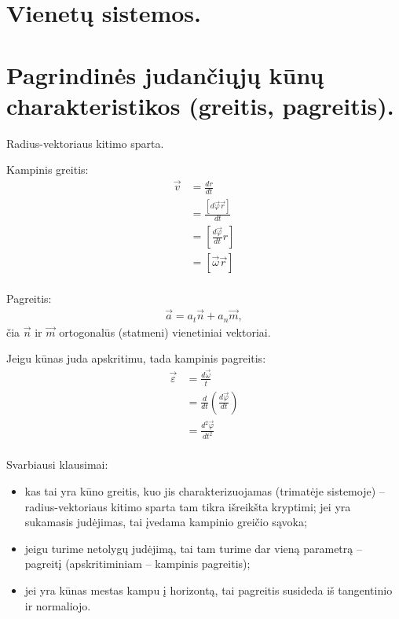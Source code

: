 \section{Vienetų sistemos.}

\section{Pagrindinės judančiųjų kūnų charakteristikos (greitis, pagreitis).}

\begin{defn}[Greitis]
  Radius-vektoriaus kitimo sparta.
\end{defn}

Kampinis greitis:
\begin{align*}
  \vec{v}
  &= \frac{dr}{dt} \\
  &= \frac{\left[ d\vec{\varphi} \vec{r} \right]}{dt} \\
  &= \left[ \frac{d\vec{\varphi}}{dt}r \right] \\
  &= \left[ \vec{\omega}\vec{r} \right] \\
\end{align*}

Pagreitis:
\begin{align*}
  \vec{a} = a_{t} \vec{n} + a_{n} \vec{m},
\end{align*}
čia $\vec{n}$ ir $\vec{m}$ ortogonalūs (statmeni) vienetiniai vektoriai. 

Jeigu kūnas juda apskritimu, tada kampinis pagreitis:
\begin{align*}
  \vec{\varepsilon}
  &= \frac{d\vec{\omega}}{t} \\
  &= \frac{d}{dt}\left( \frac{d\vec{\varphi}}{dt} \right) \\
  &= \frac{d^{2} \vec{\varphi}}{dt^{2}} \\
\end{align*}

Svarbiausi klausimai:
\begin{itemize}
  \item kas tai yra kūno greitis, kuo jis charakterizuojamas (trimatėje
    sistemoje) – radius-vektoriaus kitimo sparta tam tikra išreikšta
    kryptimi; jei yra sukamasis judėjimas, tai įvedama kampinio greičio
    sąvoka;
  \item jeigu turime netolygų judėjimą, tai tam turime dar vieną parametrą
    – pagreitį (apskritiminiam – kampinis pagreitis);
  \item jei yra kūnas mestas kampu į horizontą, tai pagreitis susideda
    iš tangentinio ir normaliojo.
\end{itemize}

